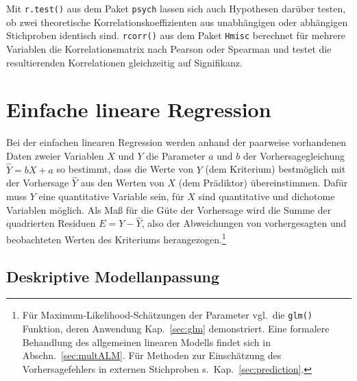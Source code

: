 Mit \lstinline!r.test()! aus dem Paket \lstinline!psych! \cite{Revelle2009} lassen sich auch Hypothesen darüber testen, ob zwei theoretische Korrelationskoeffizienten aus unabhängigen oder abhängigen Stichproben identisch sind. \lstinline!rcorr()! aus dem Paket \lstinline!Hmisc! \cite{HarrellJr2008a} berechnet für mehrere Variablen die Korrelationsmatrix nach Pearson oder Spearman und testet die resultierenden Korrelationen gleichzeitig auf Signifikanz.

\section{Einfache lineare Regression}
\label{sec:regrSimple}

Bei der einfachen linearen Regression werden anhand der paarweise vorhandenen Daten zweier Variablen $X$ und $Y$ die Parameter $a$ und $b$ der Vorhersagegleichung $\hat{Y} = b X + a$ so bestimmt, dass die Werte von $Y$ (dem Kriterium) bestmöglich mit der Vorhersage $\hat{Y}$ aus den Werten von $X$ (dem Prädiktor) übereinstimmen. Dafür muss $Y$ eine quantitative Variable sein, für $X$ sind quantitative und dichotome Variablen möglich. Als Maß für die Güte der Vorhersage wird die Summe der quadrierten Residuen $E = Y - \hat{Y}$, also der Abweichungen von vorhergesagten und beobachteten Werten des Kriteriums herangezogen.\footnote{Für Maximum-Likelihood-Schätzungen der Parameter vgl.\ die \lstinline!glm()! Funktion, deren Anwendung Kap.\ \ref{sec:glm} demonstriert. Eine formalere Behandlung des allgemeinen linearen Modells findet sich in Abschn.\ \ref{sec:multALM}. Für Methoden zur Einschätzung des Vorhersagefehlers in externen Stichproben s.\ Kap.\ \ref{sec:prediction}.}

\subsection{Deskriptive Modellanpassung}
\label{sec:regrSimpleDescr}

